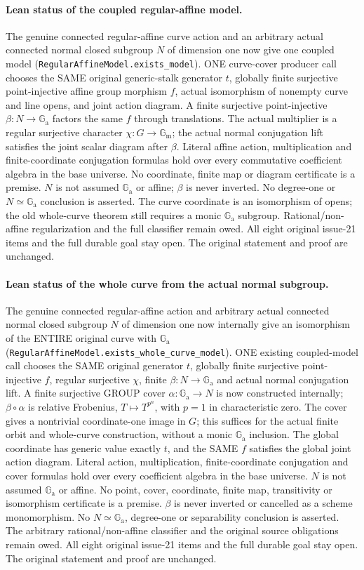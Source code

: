 \documentclass[11pt,oneside]{article}
\theoremstyle{definition}
\theoremstyle{remark}
\newcommand{\Ga}{\mathbb G_{\mathrm a}}
\newcommand{\Gm}{\mathbb G_{\mathrm m}}
\newcommand{\lean}[1]{\nolinkurl{#1}}
\begin{document}
\paragraph{Lean status of the coupled regular-affine model.}
The genuine connected regular-affine curve action and an arbitrary actual connected normal
closed subgroup $N$ of dimension one now give one coupled model
(\lean{RegularAffineModel.exists_model}). ONE curve-cover producer call chooses the SAME
original generic-stalk generator $t$, globally finite surjective point-injective affine
group morphism $f$, actual isomorphism of nonempty curve and line opens, and joint action
diagram. A finite surjective point-injective $\beta:N\to\Ga$ factors the same $f$ through
translations. The actual multiplier is a regular surjective character $\chi:G\to\Gm$;
the actual normal conjugation lift satisfies the joint scalar diagram after $\beta$.
Literal affine action, multiplication and finite-coordinate conjugation formulas hold
over every commutative coefficient algebra in the base universe. No coordinate, finite
map or diagram certificate is a premise. $N$ is not assumed $\Ga$ or affine; $\beta$ is
never inverted. No degree-one or $N\simeq\Ga$ conclusion is asserted. The curve coordinate
is an isomorphism of opens; the old whole-curve theorem still requires a monic $\Ga$
subgroup. Rational/non-affine regularization and the full classifier remain owed. All
eight original issue-21 items and the full durable goal stay open. The original statement
and proof are unchanged.

\paragraph{Lean status of the whole curve from the actual normal subgroup.}
The genuine connected regular-affine action and arbitrary actual connected normal closed
subgroup $N$ of dimension one now internally give an isomorphism of the ENTIRE original
curve with $\Ga$ (\lean{RegularAffineModel.exists_whole_curve_model}). ONE existing
coupled-model call chooses the SAME original generator $t$, globally finite surjective
point-injective $f$, regular surjective $\chi$, finite $\beta:N\to\Ga$ and actual normal
conjugation lift. A finite surjective GROUP cover $\alpha:\Ga\to N$ is now constructed
internally; $\beta\circ\alpha$ is relative Frobenius, $T\mapsto T^{p^n}$, with $p=1$
in characteristic zero. The cover gives a nontrivial coordinate-one image in $G$; this
suffices for the actual finite orbit and whole-curve construction, without a monic $\Ga$
inclusion. The global coordinate has generic value exactly $t$, and the SAME $f$ satisfies
the global joint action diagram. Literal action, multiplication, finite-coordinate
conjugation and cover formulas hold over every coefficient algebra in the base universe.
$N$ is not assumed $\Ga$ or affine. No point, cover, coordinate, finite map, transitivity
or isomorphism certificate is a premise. $\beta$ is never inverted or cancelled as a
scheme monomorphism. No $N\simeq\Ga$, degree-one or separability conclusion is asserted.
The arbitrary rational/non-affine classifier and the original source obligations remain
owed. All eight original issue-21 items and the full durable goal stay open. The original
statement and proof are unchanged.
\end{document}
